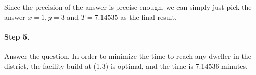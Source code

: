 \documentclass[11pt]{article}
\begin{document}
Since the precision of the answer is precise enough, we can simply just pick the answer $x = 1,y = 3$ and $T = 7.14535$ as the final result.
\paragraph{Step 5.} Answer the question.
In order to minimize the time to reach any dweller in the district, the facility build at (1,3) is optimal, and the time is 7.14536 minutes.


 
\end{document}
